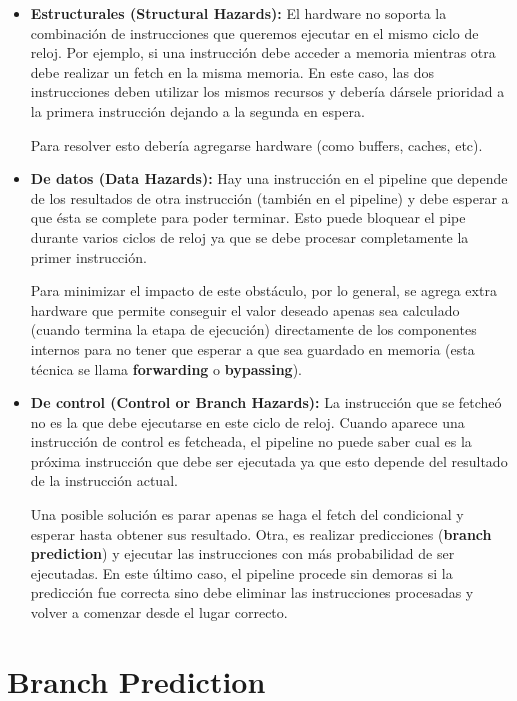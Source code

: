 \begin{itemize}
	\item \textbf{Estructurales (Structural Hazards):} El hardware no soporta la combinación de instrucciones que queremos ejecutar en el mismo ciclo de reloj. Por ejemplo, si una instrucción debe acceder a memoria mientras otra debe realizar un fetch en la misma memoria. En este caso, las dos instrucciones deben utilizar los mismos recursos y debería dársele prioridad a la primera instrucción dejando a la segunda en espera.
	
	Para resolver esto debería agregarse hardware (como buffers, caches, etc).
	\item \textbf{De datos (Data Hazards):} Hay una instrucción en el pipeline que depende de los resultados de otra instrucción (también en el pipeline) y debe esperar a que ésta se complete para poder terminar. Esto puede bloquear el pipe durante varios ciclos de reloj ya que se debe procesar completamente la primer instrucción. 
	
	Para minimizar el impacto de este obstáculo, por lo general, se agrega extra hardware que permite conseguir el valor deseado apenas sea calculado (cuando termina la etapa de ejecución) directamente de los componentes internos para no tener que esperar a que sea guardado en memoria (esta técnica se llama \textbf{forwarding} o \textbf{bypassing}).
	
	\item \textbf{De control (Control or Branch Hazards):} La instrucción que se fetcheó no es la que debe ejecutarse en este ciclo de reloj. Cuando aparece una instrucción de control es fetcheada, el pipeline no puede saber cual es la próxima instrucción que debe ser ejecutada ya que esto depende del resultado de la instrucción actual.
	
	Una posible solución es parar apenas se haga el fetch del condicional y esperar hasta obtener sus resultado. Otra, es realizar predicciones (\textbf{branch prediction}) y ejecutar las instrucciones con más probabilidad de ser ejecutadas. En este último caso, el pipeline procede sin demoras si la predicción fue correcta sino debe eliminar las instrucciones procesadas y volver a comenzar desde el lugar correcto.
\end{itemize}

\newpage
\section{Branch Prediction}\label{sec::branchPrediction}

